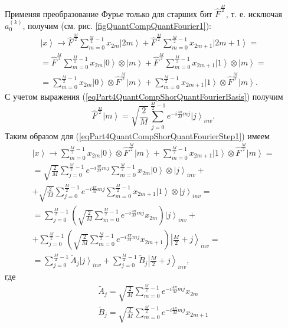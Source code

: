 Применяя преобразование Фурье только для старших бит $\hat{F}^{\frac{M}{2}}$,
т. е. исключая $a^{(k)}_0$, получим (см. рис. \ref{figQuantCompQuantFourier1}):
\begin{eqnarray}
\left|x\right> \rightarrow
\hat{F}^{\frac{M}{2}} \sum_{m = 0}^{\frac{M}{2} - 1}x_{2m} \left|2m\right> +
\hat{F}^{\frac{M}{2}} \sum_{m = 0}^{\frac{M}{2} - 1}x_{2m + 1}
\left|2m+1\right> = 
\nonumber \\
=
\hat{F}^{\frac{M}{2}} \sum_{m = 0}^{\frac{M}{2} - 1}x_{2m} 
\left|0\right> \otimes  \left|m\right> +
\hat{F}^{\frac{M}{2}} \sum_{m = 0}^{\frac{M}{2} - 1}x_{2m + 1}
\left|1\right> \otimes  \left|m\right>
=
\nonumber \\
=
\sum_{m = 0}^{\frac{M}{2} - 1}x_{2m} 
\left|0\right> \otimes \hat{F}^{\frac{M}{2}} \left|m\right> +
\sum_{m = 0}^{\frac{M}{2} - 1}x_{2m + 1}
\left|1\right> \otimes \hat{F}^{\frac{M}{2}} \left|m\right>.
\label{eqPart4QuantCompShorQuantFourierStep1}
\end{eqnarray}
С учетом выражения (\ref{eqPart4QuantCompShorQuantFourierBasis}) получим
\begin{equation}
\hat{F}^{\frac{M}{2}} \left|m\right> = \sqrt{\frac{2}{M}}
\sum_{j= 0}^{\frac{M}{2} - 1} e^{-i \frac{4 \pi}{M} m j}\left|j\right>_{inv}.
\nonumber
\end{equation}
Таким образом для (\ref{eqPart4QuantCompShorQuantFourierStep1}) имеем
\begin{eqnarray}
\left|x\right> \rightarrow
\sum_{m = 0}^{\frac{M}{2} - 1}x_{2m} 
\left|0\right> \otimes \hat{F}^{\frac{M}{2}} \left|m\right> +
\sum_{m = 0}^{\frac{M}{2} - 1}x_{2m + 1}
\left|1\right> \otimes \hat{F}^{\frac{M}{2}} \left|m\right> = 
\nonumber \\
=
\sqrt{\frac{2}{M}} \sum_{j = 0}^{\frac{M}{2} - 1} e^{-i \frac{4 \pi}{M} m j} 
\sum_{m = 0}^{\frac{M}{2} - 1}x_{2m} \left|0\right> \otimes
\left|j\right>_{inv}
+
\nonumber \\
+
\sqrt{\frac{2}{M}} \sum_{j = 0}^{\frac{M}{2} - 1} e^{-i \frac{4 \pi}{M} m j} 
\sum_{m = 0}^{\frac{M}{2} - 1}x_{2m+1} \left|1\right> \otimes
\left|j\right>_{inv}
=
\nonumber \\
=
\sum_{j = 0}^{\frac{M}{2} - 1}  
\left( \sqrt{\frac{2}{M}} 
\sum_{m = 0}^{\frac{M}{2} - 1} e^{-i \frac{4 \pi}{M} m j} x_{2m} 
\right) \left|j\right>_{inv}
+
\nonumber \\
+
\sum_{j = 0}^{\frac{M}{2} - 1}
\left( \sqrt{\frac{2}{M}}  
\sum_{m = 0}^{\frac{M}{2} - 1}e^{-i \frac{4 \pi}{M} m j} x_{2m+1} 
\right)
\left|\frac{M}{2} + j\right>_{inv}
=
\nonumber \\
= \sum^{\frac{M}{2} - 1}_{j = 0}  \tilde{A}_{j} \left|j\right>_{inv} +
\sum^{\frac{M}{2} - 1}_{j = 0}  \tilde{B}_{j} \left|\frac{M}{2} + j\right>_{inv},
\nonumber
\end{eqnarray}
где
\begin{eqnarray}
\tilde{A}_{j} = 
\sqrt{\frac{2}{M}} 
\sum_{m = 0}^{\frac{M}{2} - 1} e^{-i \frac{4 \pi}{M} m j} x_{2m} 
\nonumber \\
\tilde{B}_{j} =
\sqrt{\frac{2}{M}} 
\sum_{m = 0}^{\frac{M}{2} - 1} e^{-i \frac{4 \pi}{M} m j} x_{2m+1} 
\label{eqPart4QuantCompShorAB}
\end{eqnarray}

